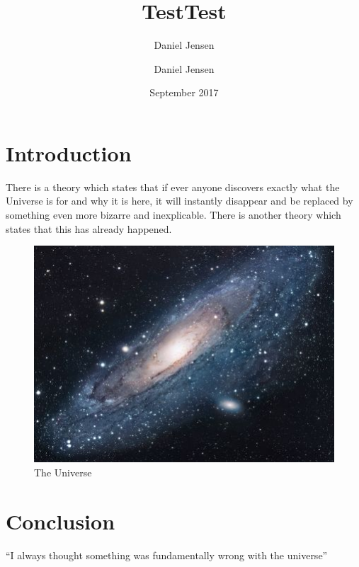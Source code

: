 \documentclass{article}
\title{Test}
\author{Daniel Jensen}\documentclass{article}
\title{Test}
\author{Daniel Jensen}
\date{September 2017}
\begin{document}
\maketitle

\section{Introduction}
There is a theory which states that if ever anyone discovers exactly what the Universe is for and why it is here, it will instantly disappear and be replaced by something even more bizarre and inexplicable.
There is another theory which states that this has already happened.\citep{adams1995hitchhiker2}

\begin{figure}[h!]
\centering
\includegraphics[scale=1.7]{universe.jpg}
\caption{The Universe}
\label{fig:univerise}
\end{figure}

\section{Conclusion}
``I always thought something was fundamentally wrong with the universe'' \citep{adams1995hitchhiker}



\end{document}
